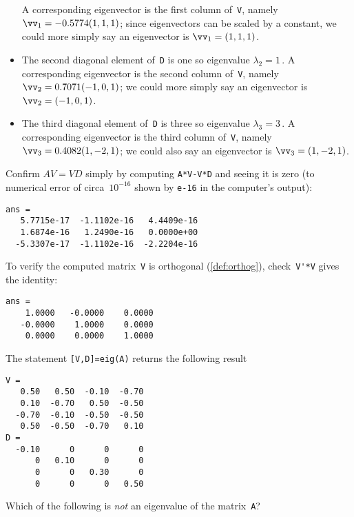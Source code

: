 \begin{example}
\begin{solution}
\begin{itemize}
A corresponding eigenvector is the first column of~\verb|V|, namely \(\vv_1=-0.5774(1,1,1)\);  since eigenvectors can be scaled by a constant, we could more simply say an eigenvector is \(\vv_1=(1,1,1)\).
\item The second diagonal element of~\verb|D| is one so eigenvalue \(\lambda_2=1\)\,.
A corresponding eigenvector is the second column of~\verb|V|, namely \(\vv_2=0.7071(-1,0,1)\);  we could more simply say an eigenvector is \(\vv_2=(-1,0,1)\).
\item The third diagonal element of~\verb|D| is three so eigenvalue \(\lambda_3=3\)\,.
A corresponding eigenvector is the third column of~\verb|V|, namely \(\vv_3=0.4082(1,-2,1)\);  we could also say an eigenvector is \(\vv_3=(1,-2,1)\).
\end{itemize}
Confirm \(AV=VD\) simply by computing \verb|A*V-V*D| and seeing it is zero (to numerical error of circa~\(10^{-16}\) shown by \verb|e-16| in the computer's output):
\begin{verbatim}
ans =
   5.7715e-17  -1.1102e-16   4.4409e-16
   1.6874e-16   1.2490e-16   0.0000e+00
  -5.3307e-17  -1.1102e-16  -2.2204e-16
\end{verbatim}
To verify the computed matrix~\verb|V| is orthogonal (\cref{def:orthog}), check~\verb|V'*V| gives the identity:
\begin{verbatim}
ans =
    1.0000   -0.0000    0.0000
   -0.0000    1.0000    0.0000
    0.0000    0.0000    1.0000
\end{verbatim}
\end{solution}
\end{example}




\begin{activity}
The statement \verb|[V,D]=eig(A)| returns the following result \twodp
\begin{verbatim}
V =
   0.50   0.50  -0.10  -0.70
   0.10  -0.70   0.50  -0.50
  -0.70  -0.10  -0.50  -0.50
   0.50  -0.50  -0.70   0.10
D =
  -0.10      0      0      0
      0   0.10      0      0
      0      0   0.30      0
      0      0      0   0.50
\end{verbatim}
Which of the following is \emph{not} an eigenvalue of the matrix~\verb|A|?
\end{activity}





